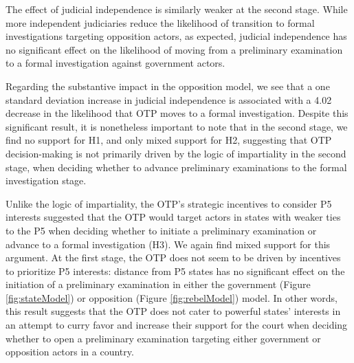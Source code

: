 The effect of judicial independence is similarly weaker at the second stage. While more independent judiciaries reduce the likelihood of transition to formal investigations targeting opposition actors, as expected, judicial independence has no significant effect on the likelihood of moving from a preliminary examination to a formal investigation against government actors. %

Regarding the substantive impact in the opposition model, we see that a one standard deviation increase in judicial independence is associated with a 4.02 decrease in the likelihood that OTP moves to a formal investigation. Despite this significant result, it is nonetheless important to note that in the second stage,  we find no support for H1, and only mixed support for H2, suggesting that OTP decision-making is not primarily driven by the logic of impartiality in the second stage, when deciding whether to advance preliminary examinations to the formal investigation stage.

Unlike the logic of impartiality, the OTP's strategic incentives to consider P5 interests suggested that the OTP would target actors in states with weaker ties to the P5 when deciding whether to initiate a preliminary examination or advance to a formal investigation (H3). We again find mixed support for this argument. At the first stage, the OTP does not seem to be driven by incentives to prioritize P5 interests: distance from P5 states has no significant effect on the initiation of a preliminary examination in either the government (Figure \ref{fig:stateModel}) or opposition (Figure \ref{fig:rebelModel}) model. In other words, this result suggests that the OTP does not cater to powerful states' interests in an attempt to curry favor and increase their support for the court when deciding whether to open a preliminary examination targeting either government or opposition actors in a country.

